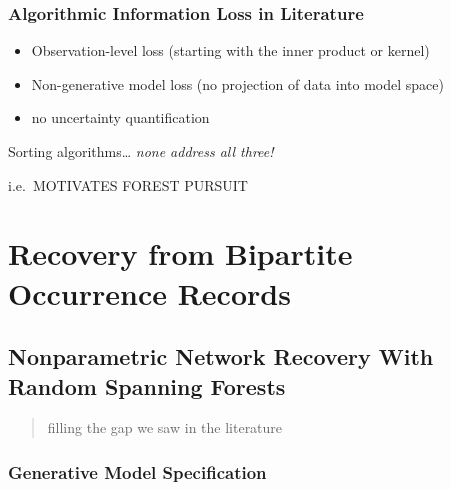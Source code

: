 \documentclass[%
	12pt,
		oneside,
		letterpaper
]{book}
\providecommand{\tightlist}{%
  \setlength{\itemsep}{0pt}\setlength{\parskip}{0pt}}\usepackage{longtable,booktabs,array}
\begin{document}
\section{Algorithmic Information Loss in
Literature}\label{algorithmic-information-loss-in-literature}

\begin{itemize}
\tightlist
\item
  Observation-level loss (starting with the inner product or kernel)
\item
  Non-generative model loss (no projection of data into model space)
\item
  no uncertainty quantification
\end{itemize}

Sorting algorithms\ldots{} \emph{none address all three!}

i.e.~MOTIVATES FOREST PURSUIT

\part{Recovery from Bipartite Occurrence Records}

\chapter{Nonparametric Network Recovery With Random Spanning
Forests}\label{nonparametric-network-recovery-with-random-spanning-forests}

\begin{quote}
filling the gap we saw in the literature
\end{quote}

\section{Generative Model
Specification}\label{generative-model-specification}
\end{document}
